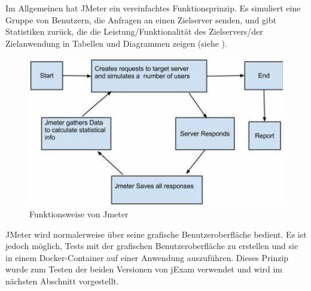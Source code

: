 Im Allgemeinen hat JMeter ein vereinfachtes Funktionsprinzip. Es simuliert
eine Gruppe von Benutzern, die Anfragen an einen Zielserver senden, und
gibt Statistiken zurück, die die Leistung/Funktionalität des Zielservers/der
Zielanwendung in Tabellen und Diagrammen zeigen (siehe ).

\begin{figure}[H]
    \centering
    \includegraphics[scale=1]{images/jmeter-princip}
    \caption{Funktionsweise von Jmeter} \label{fig:jmeter-prinzip}
\end{figure}

JMeter wird normalerweise  über seine grafische Benutzeroberfläche
bedient. Es ist  jedoch möglich, Tests mit der grafischen
Benutzeroberfläche zu erstellen und sie in einem Docker-Container auf einer
Anwendung auszuführen. Dieses  Prinzip wurde zum Testen der beiden Versionen
von jExam verwendet und wird  im nächsten Abschnitt vorgestellt.






